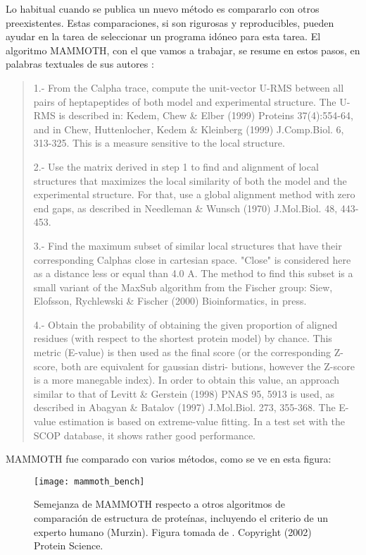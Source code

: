 Lo habitual cuando se publica un nuevo m\'{e}todo es compararlo con otros preexistentes. Estas comparaciones, 
si son rigurosas y reproducibles, pueden ayudar en la tarea de seleccionar un programa id\'{o}neo 
para esta tarea. El algoritmo MAMMOTH, con el que vamos a trabajar, se resume en estos pasos, 
en palabras textuales de sus autores \citep{Ortiz2002}:
\begin{quote}
 1.- From the Calpha trace,  compute the unit-vector  U-RMS  between
 all pairs of heptapeptides of both model and experimental structure.
 The  U-RMS is  described  in:  Kedem, Chew & Elber  (1999)  Proteins
 37(4):554-64,  and  in  Chew, Huttenlocher, Kedem & Kleinberg (1999)
 J.Comp.Biol. 6, 313-325.  This is a measure sensitive  to  the local
 structure.

  2.- Use the matrix derived in step 1 to find and alignment of local
 structures that maximizes the local similarity of both the model and
 the  experimental structure. For that, use a global alignment method 
 with  zero  end  gaps,  as  described  in  Needleman & Wunsch (1970) 
 J.Mol.Biol. 48, 443-453.

  3.- Find the maximum subset of similar  local  structures that have
 their corresponding  Calphas  close  in  cartesian space. "Close" is
 considered here  as  a distance less or equal than 4.0 A. The method
 to  find this subset is a small variant of the MaxSub algorithm from
 the  Fischer  group:  Siew,  Elofsson,  Rychlewski  & Fischer (2000)
 Bioinformatics, in press.

  4.- Obtain  the  probability  of  obtaining the given proportion of
 aligned residues (with respect to the  shortest  protein  model)  by
 chance.  This  metric  (E-value) is then used as the final score (or 
 the  corresponding Z-score, both are equivalent for gaussian distri-
 butions, however the Z-score is a more manegable index). In order to
 obtain this  value, an approach similar to that of Levitt & Gerstein 
 (1998) PNAS 95, 5913 is used, as  described  in  Abagyan  &  Batalov 
 (1997) J.Mol.Biol. 273, 355-368.  The E-value estimation is based on
 extreme-value fitting.  In  a  test  set  with the SCOP database, it 
 shows rather good performance.
\end{quote}
 
MAMMOTH fue comparado con varios m\'{e}todos, como se ve en esta figura:  

\begin{figure}
\begin{center} 
\texttt{[image: mammoth\_bench]}
\caption%
{
Semejanza de MAMMOTH respecto a otros algoritmos de comparaci\'{o}n de estructura de prote\'{i}nas, 
incluyendo el criterio de un experto humano (Murzin). Figura tomada de \citet{Ortiz2002}. Copyright (2002) Protein Science.
}
\label{fig:mammoth}
\end{center}
\end{figure}

